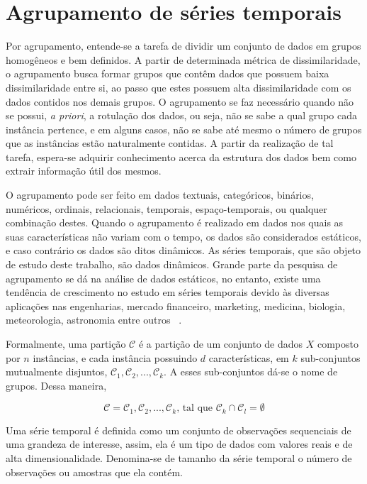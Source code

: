 \chapter{Agrupamento de séries temporais} \label{cap:agrupamento_series_temporais}

Por agrupamento, entende-se a tarefa de dividir um conjunto de dados em grupos homogêneos e bem definidos. A partir de determinada métrica de dissimilaridade, o agrupamento busca formar grupos que contêm dados que possuem baixa dissimilaridade entre si, ao passo que estes possuem alta dissimilaridade com os dados contidos nos demais grupos. O agrupamento se faz necessário quando não se possui, \emph{a priori}, a rotulação dos dados, ou seja, não se sabe a qual grupo cada instância pertence, e em alguns casos, não se sabe até mesmo o número de grupos que as instâncias estão naturalmente contidas. A partir da realização de tal tarefa, espera-se adquirir conhecimento acerca da estrutura dos dados bem como extrair informação útil dos mesmos.

O agrupamento pode ser feito em dados textuais, categóricos, binários, numéricos, ordinais, relacionais, temporais, espaço-temporais, ou qualquer combinação destes. Quando o agrupamento é realizado em dados nos quais as suas características não variam com o tempo, os dados são considerados estáticos, e caso contrário os dados são ditos dinâmicos. As séries temporais, que são objeto de estudo deste trabalho, são dados dinâmicos. Grande parte da pesquisa de agrupamento se dá na análise de dados estáticos, no entanto, existe uma tendência de crescimento no estudo em séries temporais devido às diversas aplicações nas engenharias, mercado financeiro, marketing, medicina, biologia, meteorologia, astronomia entre outros ~\parencite{Liao}.

Formalmente, uma partição $\mathcal{C}$ é a partição de um conjunto de dados $X$ composto por $n$ instâncias, e cada instância possuindo $d$ características, em $k$ sub-conjuntos mutualmente disjuntos, $\mathcal{C}_1,\mathcal{C}_2,...,\mathcal{C}_k$. A esses sub-conjuntos dá-se o nome de grupos. Dessa maneira,

\begin{equation}
\mathcal{C} = {\mathcal{C}_1,\mathcal{C}_2,...,\mathcal{C}_k} \text{,  tal que } \mathcal{C}_k \cap \mathcal{C}_l = \emptyset
\end{equation}

Uma série temporal é definida como um conjunto de observações sequenciais de uma grandeza de interesse, assim, ela é um tipo de dados com valores reais e de alta dimensionalidade. Denomina-se de tamanho da série temporal o número de observações ou amostras que ela contém.

